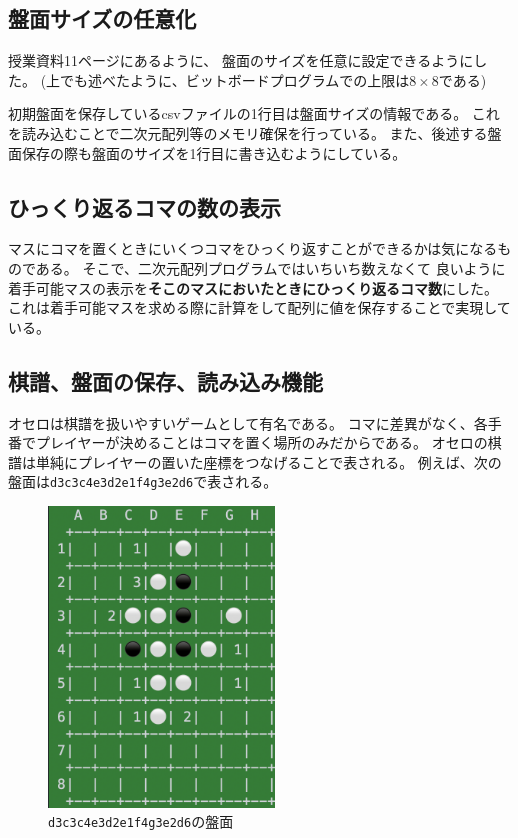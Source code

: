 \documentclass{jsarticle}
\begin{document}
    \subsection{盤面サイズの任意化}
        授業資料11ページにあるように、
        盤面のサイズを任意に設定できるようにした。
        (上でも述べたように、ビットボードプログラムでの上限は$8\times 8$である)

        初期盤面を保存しているcsvファイルの1行目は盤面サイズの情報である。
        これを読み込むことで二次元配列等のメモリ確保を行っている。
        また、後述する盤面保存の際も盤面のサイズを1行目に書き込むようにしている。

    \subsection{ひっくり返るコマの数の表示}
        マスにコマを置くときにいくつコマをひっくり返すことができるかは気になるものである。
        そこで、二次元配列プログラムではいちいち数えなくて
        良いように着手可能マスの表示を{\bf そこのマスにおいたときにひっくり返るコマ数}にした。
        これは着手可能マスを求める際に計算をして配列に値を保存することで実現している。

    \subsection{棋譜、盤面の保存、読み込み機能}
        オセロは棋譜を扱いやすいゲームとして有名である。
        コマに差異がなく、各手番でプレイヤーが決めることはコマを置く場所のみだからである。
        オセロの棋譜は単純にプレイヤーの置いた座標をつなげることで表される。
        例えば、次の盤面は\verb|d3c3c4e3d2e1f4g3e2d6|で表される。

        \begin{figure}[h]
            \centering
            \includegraphics[width=6cm]{record_board.png}
            \cprotect\caption{\verb|d3c3c4e3d2e1f4g3e2d6|の盤面}
        \end{figure}
\end{document}
